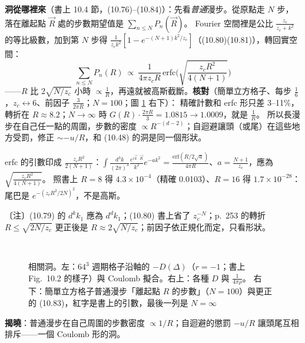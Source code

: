 \textbf{洞從哪裡來}（書上 10.4 節，(10.76)--(10.84)）：先看\emph{普通}漫步。從原點走 $N$ 步，落在離起點 $\vec R$ 處的步數期望值是 $\sum_{n\le N}P_n(\vec R)$。
Fourier 空間裡是公比 $\frac{z_c}{z_c+k^2}$ 的等比級數，加到第 $N$ 步得 $\frac1{z_ck^2}[1-e^{-(N+1)k^2/z_c}]$（(10.80)(10.81)），轉回實空間：
\[\sum_{n\le N}P_n(R)\ \propto\ \frac1{4\pi z_cR}\,\mathrm{erfc}\Big(\sqrt{\frac{z_cR^2}{4(N+1)}}\Big)\tag{10.83}\]
——$R$ 比 $2\sqrt{N/z_c}$ 小時 $\propto\frac1R$，再遠就被高斯截斷。\textbf{核對}（簡單立方格子、每步 $\frac16$，$z_c\leftrightarrow6$、前因子 $\frac3{2\pi R}$；$N=100$；圖 \ref{ten-fig-hole} 右下）：
精確計數和 erfc 形只差 3--11\%，轉折在 $R\approx8.2$；$N\to\infty$ 時 $G(R)\cdot\frac{2\pi R}3=1.0815\to1.0009$，就是 $\frac1R$。
所以長漫步在自己任一點的周圍，步數的密度 $\propto R^{-(d-2)}$；自迴避讓頭（或尾）在這些地方受罰，修正 $\sim-u/R$，和 (10.48) 的洞是同一個形狀。
\begin{errbox}[p.~253，(10.83)]
erfc 的引數印成 $\frac{z_cR^2}{2(N+1)}$：$\int\frac{d^3k}{(2\pi)^3}\frac{e^{i\vec k\cdot\vec R}}{k^2}e^{-ak^2}=\frac{\mathrm{erf}(R/2\sqrt a)}{4\pi R}$、$a=\frac{N+1}{z_c}$，應為 $\sqrt{\frac{z_cR^2}{4(N+1)}}$。
照書上 $R=8$ 得 $4.3\times10^{-4}$（精確 0.0103）、$R=16$ 得 $1.7\times10^{-28}$：尾巴是 $e^{-(z_cR^2/2N)^2}$，不是高斯。
\end{errbox}
〔注〕(10.79) 的 $d^kk_1$ 應為 $d^dk_1$；(10.80) 書上省了 $z_c^{-N}$；p.~253 的轉折 $R\le\sqrt{2N/z_c}$ 更正後是 $R\approx2\sqrt{N/z_c}$；前因子依正規化而定，只看形狀。

\begin{figure}[htbp]
\centering
\begin{minipage}[c]{0.46\linewidth}\centering\TenFigHole\end{minipage}\hfill
\begin{minipage}[c]{0.52\linewidth}\centering\footnotesize\setlength{\tabcolsep}{2.5pt}\TenTabHole\\[8pt]\TenTabVisits\end{minipage}
\caption{相關洞。左：$64^3$ 週期格子沿軸的 $-D(\Delta)$（$r=-1$；書上 Fig.~10.2 的樣子）與 Coulomb 擬合。右上：各種 $D$ 與 $\frac1{4\pi\rho}$。
右下：簡單立方格子普通漫步「離起點 $R$ 的步數」（$N=100$）與更正的 (10.83)，紅字是書上的引數，最後一列是 $N=\infty$}\label{ten-fig-hole}
\end{figure}

\textbf{揭曉}：普通漫步在自己周圍的步數密度 $\propto1/R$；自迴避的懲罰 $-u/R$ 讓頭尾互相排斥——一個 Coulomb 形的洞。

